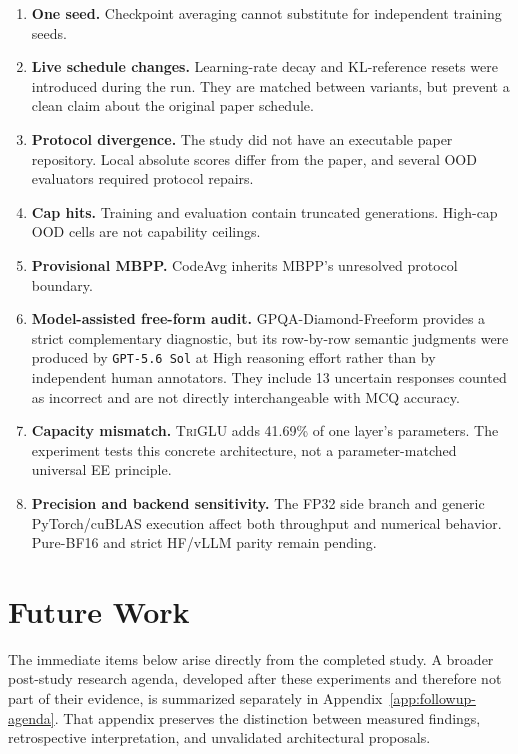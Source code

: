 \documentclass[10pt]{article}
\newcommand{\TriGLU}{\textsc{TriGLU}}
\begin{document}
\begin{enumerate}
  \item \textbf{One seed.}  Checkpoint averaging cannot substitute for
        independent training seeds.
  \item \textbf{Live schedule changes.}  Learning-rate decay and KL-reference
        resets were introduced during the run.  They are matched between
        variants, but prevent a clean claim about the original paper schedule.
  \item \textbf{Protocol divergence.}  The study did not have an executable
        paper repository.  Local absolute scores differ from the paper, and
        several OOD evaluators required protocol repairs.
  \item \textbf{Cap hits.}  Training and evaluation contain truncated
        generations.  High-cap OOD cells are not capability ceilings.
  \item \textbf{Provisional MBPP.}  CodeAvg inherits MBPP's unresolved
        protocol boundary.
  \item \textbf{Model-assisted free-form audit.}  GPQA-Diamond-Freeform
        provides a strict complementary diagnostic, but its row-by-row
        semantic judgments were produced by \texttt{GPT-5.6 Sol} at High
        reasoning effort rather than by independent human annotators.  They
        include 13 uncertain responses counted as incorrect and are not
        directly interchangeable with MCQ accuracy.
  \item \textbf{Capacity mismatch.}  \TriGLU{} adds 41.69\% of one layer's
        parameters.  The experiment tests this concrete architecture, not a
        parameter-matched universal EE principle.
  \item \textbf{Precision and backend sensitivity.}  The FP32 side branch and
        generic PyTorch/cuBLAS execution affect both throughput and numerical
        behavior.  Pure-BF16 and strict HF/vLLM parity remain pending.
\end{enumerate}

\section{Future Work}
\label{sec:future-work}

The immediate items below arise directly from the completed study.  A broader
post-study research agenda, developed after these experiments and therefore not
part of their evidence, is summarized separately in
Appendix~\ref{app:followup-agenda}.  That appendix preserves the distinction
between measured findings, retrospective interpretation, and unvalidated
architectural proposals.
\end{document}
